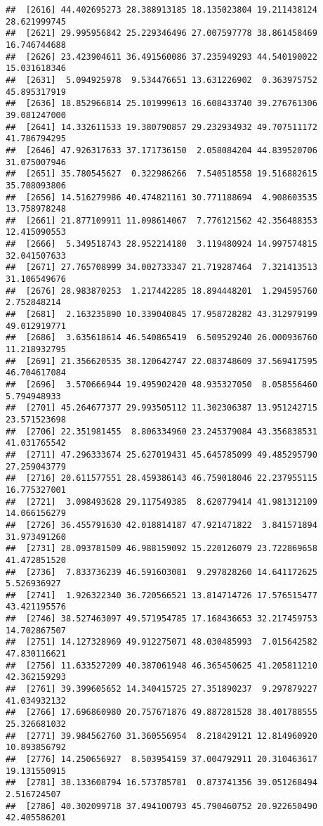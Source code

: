 \documentclass[
]{article}
\begin{document}
\begin{verbatim}
##  [2616] 44.402695273 28.388913185 18.135023804 19.211438124 28.621999745
##  [2621] 29.995956842 25.229346496 27.007597778 38.861458469 16.746744688
##  [2626] 23.423904611 36.491560086 37.235949293 44.540190022 15.031618346
##  [2631]  5.094925978  9.534476651 13.631226902  0.363975752 45.895317919
##  [2636] 18.852966814 25.101999613 16.608433740 39.276761306 39.081247000
##  [2641] 14.332611533 19.380790857 29.232934932 49.707511172 41.786794295
##  [2646] 47.926317633 37.171736150  2.058084204 44.839520706 31.075007946
##  [2651] 35.780545627  0.322986266  7.540518558 19.516882615 35.708093806
##  [2656] 14.516279986 40.474821161 30.771188694  4.908603535 13.758978248
##  [2661] 21.877109911 11.098614067  7.776121562 42.356488353 12.415090553
##  [2666]  5.349518743 28.952214180  3.119480924 14.997574815 32.041507633
##  [2671] 27.765708999 34.002733347 21.719287464  7.321413513 31.106549676
##  [2676] 28.983870253  1.217442285 18.894448201  1.294595760  2.752848214
##  [2681]  2.163235890 10.339040845 17.958728282 43.312979199 49.012919771
##  [2686]  3.635618614 46.540865419  6.509529240 26.000936760 11.218932795
##  [2691] 21.356620535 38.120642747 22.083748609 37.569417595 46.704617084
##  [2696]  3.570666944 19.495902420 48.935327050  8.058556460  5.794948933
##  [2701] 45.264677377 29.993505112 11.302306387 13.951242715 23.571523698
##  [2706] 22.351981455  8.806334960 23.245379084 43.356838531 41.031765542
##  [2711] 47.296333674 25.627019431 45.645785099 49.485295790 27.259043779
##  [2716] 20.611577551 28.459386143 46.759018046 22.237955115 16.775327001
##  [2721]  3.098493628 29.117549385  8.620779414 41.981312109 14.066156279
##  [2726] 36.455791630 42.018814187 47.921471822  3.841571894 31.973491260
##  [2731] 28.093781509 46.988159092 15.220126079 23.722869658 41.472851520
##  [2736]  7.833736239 46.591603081  9.297828260 14.641172625  5.526936927
##  [2741]  1.926322340 36.720566521 13.814714726 17.576515477 43.421195576
##  [2746] 38.527463097 49.571954785 17.168436653 32.217459753 14.702867507
##  [2751] 14.127328969 49.912275071 48.030485993  7.015642582 47.830116621
##  [2756] 11.633527209 40.387061948 46.365450625 41.205811210 42.362159293
##  [2761] 39.399605652 14.340415725 27.351890237  9.297879227 41.034932132
##  [2766] 17.696860980 20.757671876 49.887281528 38.401788555 25.326681032
##  [2771] 39.984562760 31.360556954  8.218429121 12.814960920 10.893856792
##  [2776] 14.250656927  8.503954159 37.004792911 20.310463617 19.131550915
##  [2781] 38.133608794 16.573785781  0.873741356 39.051268494  2.516724507
##  [2786] 40.302099718 37.494100793 45.790460752 20.922650490 42.405586201

\end{verbatim}
\end{document}
